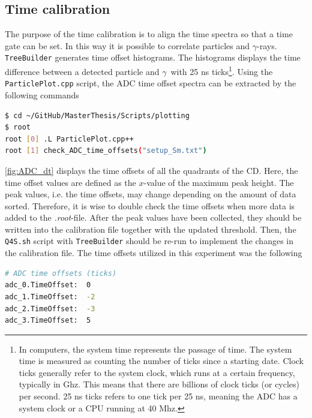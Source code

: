 \documentclass[twoside,english]{uiofysmaster/uiofysmaster}
\newcommand{\ga}{$\gamma$}
\let\orgautoref\autoref
\renewcommand{\autoref}
        {%
		 \def\sectionautorefname{Section}%
		 \def\subsectionautorefname{Section}%
		 \def\subsubsectionautorefname{Section}%
		 \def\chapterautorefname{Chapter}%
          \orgautoref}
\begin{document}
\subsection{Time calibration}\label{ssec:time_cal}
The purpose of the time calibration is to align the time spectra so that a time gate can be set. 
In this way it is possible to correlate particles and \ga-rays. 
\texttt{TreeBuilder} generates time offset histograms. 
The histograms displays the time difference between a detected particle and \ga\ with 25 ns ticks\footnote{In computers, the system time represents the passage of time. The system time is measured as counting the number of ticks since a starting date. Clock ticks generally refer to the system clock, which runs at a certain frequency, typically in Ghz. This means that there are billions of clock ticks (or cycles) per second. 25 ns ticks refers to one tick per 25 ns, meaning the ADC has a system clock or a CPU running at 40 Mhz.}.
Using the \texttt{ParticlePlot.cpp} script, the ADC time offset spectra can be extracted by the following commands
\begin{lstlisting}[language=sh]
$ cd ~/GitHub/MasterThesis/Scripts/plotting
$ root
root [0] .L ParticlePlot.cpp++
root [1] check_ADC_time_offsets("setup_Sm.txt")
\end{lstlisting}
\autoref{fig:ADC_dt} displays the time offsets of all the quadrants of the CD.
Here, the time offset values are defined as the $x$-value of the maximum peak height.
The peak values, i.e. the time offsets, may change depending on the amount of data sorted.
Therefore, it is wise to double check the time offsets when more data is added to the \textit{.root}-file. 
After the peak values have been collected, they should be written into the calibration file together with the updated threshold. 
Then, the \texttt{Q4S.sh} script with \texttt{TreeBuilder} should be re-run to implement the changes in the calibration file. 
The time offsets utilized in this experiment was the following
\begin{lstlisting}[language=sh]
# ADC time offsets (ticks)
adc_0.TimeOffset:  0
adc_1.TimeOffset:  -2
adc_2.TimeOffset:  -3
adc_3.TimeOffset:  5
\end{lstlisting}
\end{document}
